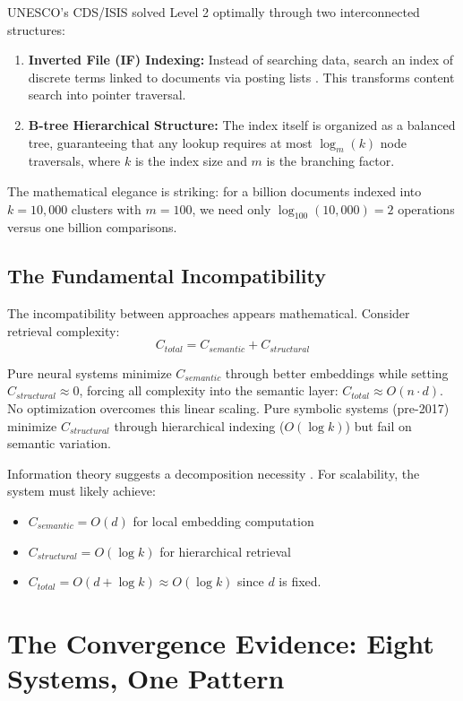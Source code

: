 \documentclass[manuscript,screen,nonacm]{acmart}
\begin{document}
UNESCO's CDS/ISIS solved Level 2 optimally through two interconnected structures:
\begin{enumerate}
    \item \textbf{Inverted File (IF) Indexing:} Instead of searching data, search an index of discrete terms linked to documents via posting lists \cite{zobel2006}. This transforms content search into pointer traversal.
    \item \textbf{B-tree Hierarchical Structure:} The index itself is organized as a balanced tree, guaranteeing that any lookup requires at most $\log_m(k)$ node traversals, where $k$ is the index size and $m$ is the branching factor.
\end{enumerate}

The mathematical elegance is striking: for a billion documents indexed into $k=10,000$ clusters with $m=100$, we need only $\log_{100}(10,000) = 2$ operations versus one billion comparisons.

\subsection{The Fundamental Incompatibility}

The incompatibility between approaches appears mathematical. Consider retrieval complexity:
\[ C_{total} = C_{semantic} + C_{structural} \]

Pure neural systems minimize $C_{semantic}$ through better embeddings while setting $C_{structural} \approx 0$, forcing all complexity into the semantic layer: $C_{total} \approx O(n \cdot d)$. No optimization overcomes this linear scaling. Pure symbolic systems (pre-2017) minimize $C_{structural}$ through hierarchical indexing ($O(\log k)$) but fail on semantic variation.

Information theory suggests a decomposition necessity \cite{chen2025}. For scalability, the system must likely achieve:
\begin{itemize}
    \item $C_{semantic} = O(d)$ for local embedding computation
    \item $C_{structural} = O(\log k)$ for hierarchical retrieval
    \item $C_{total} = O(d + \log k) \approx O(\log k)$ since $d$ is fixed.
\end{itemize}

\section{The Convergence Evidence: Eight Systems, One Pattern}
\end{document}
